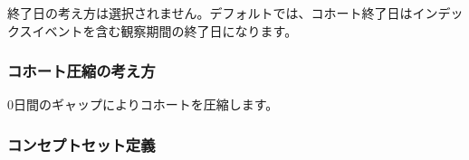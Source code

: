 \documentclass[
  11pt]{book}
\theoremstyle{definition}
\theoremstyle{definition}
\theoremstyle{definition}
\theoremstyle{definition}
\theoremstyle{remark}
\begin{document}
終了日の考え方は選択されません。デフォルトでは、コホート終了日はインデックスイベントを含む観察期間の終了日になります。

\subsubsection*{コホート圧縮の考え方}\label{ux30b3ux30dbux30fcux30c8ux5727ux7e2eux306eux8003ux3048ux65b9-5}

0日間のギャップによりコホートを圧縮します。

\subsubsection*{コンセプトセット定義}\label{ux30b3ux30f3ux30bbux30d7ux30c8ux30bbux30c3ux30c8ux5b9aux7fa9-5}
\end{document}
